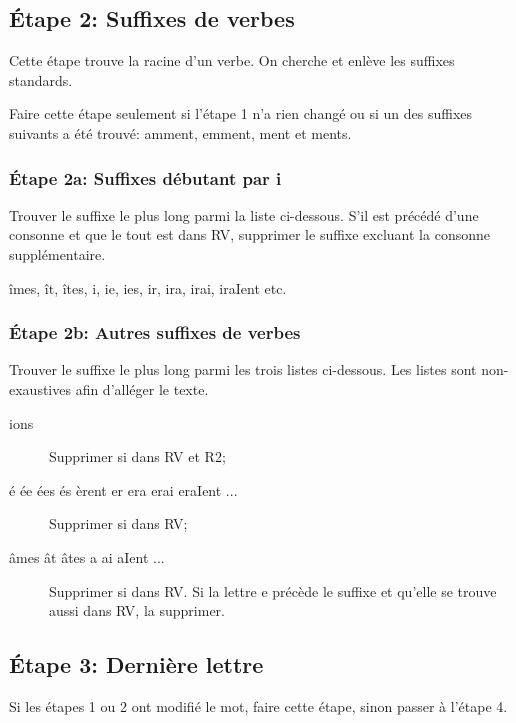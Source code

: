 \subsection*{Étape 2: Suffixes de verbes}

Cette étape trouve la racine d'un verbe.
On cherche et enlève les suffixes standards.

Faire cette étape seulement si l'étape 1 n'a rien changé ou si un des suffixes suivants a été trouvé: amment, emment, ment et ments.

\subsubsection*{Étape 2a: Suffixes débutant par i}

Trouver le suffixe le plus long parmi la liste ci-dessous.
S'il est précédé d'une consonne et que le tout est dans RV, supprimer le suffixe excluant la consonne supplémentaire.

îmes, ît, îtes, i, ie, ies, ir, ira, irai, iraIent etc.

\subsubsection*{Étape 2b: Autres suffixes de verbes}

Trouver le suffixe le plus long parmi les trois listes ci-dessous.
Les listes sont non-exaustives afin d'alléger le texte.

\begin{description}
  \item[ions]
  
  Supprimer si dans RV et R2;
  
  \item[é ée ées és èrent er era erai eraIent ...]
  
  Supprimer si dans RV;
  
  \item[âmes ât âtes a ai aIent ...]
  
  Supprimer si dans RV. Si la lettre e précède le suffixe et qu'elle se trouve aussi dans RV, la supprimer.
\end{description}

\subsection*{Étape 3: Dernière lettre}

Si les étapes 1 ou 2 ont modifié le mot, faire cette étape, sinon passer à l'étape 4.


